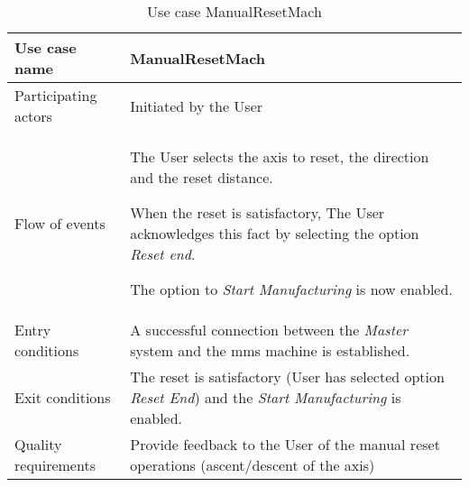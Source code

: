 \begin{table}
  \captionsetup{justification=raggedright, singlelinecheck=false}
  \caption{Use case ManualResetMach}
  \centering
  \begin{tabular}{p{}p{}}
    \hline
    Use case name & \textbf{ManualResetMach} \\ \hline
     Participating actors      & Initiated by the User \\ \hline
     Flow of events & \begin{enum-c}
     \item The User selects the axis to reset, the direction and the reset
       distance.
     \item When the reset is satisfactory, The User acknowledges this fact by
       selecting the option \emph{Reset end}.
     \item The option to \emph{Start Manufacturing} is now enabled.
     \end{enum-c}\\ \hline 
     Entry conditions       &  A successful connection between the \emph{Master}
     system and the \gls{mms} machine is established.\\ \hline 
      Exit conditions & The reset is satisfactory (User has selected option
      \emph{Reset End}) and the \emph{Start Manufacturing} is enabled.      \\ \hline 
      Quality requirements & Provide feedback to the User of the manual reset
      operations (ascent/descent of the axis) \\ \hline 
  \end{tabular}
\label{tab:us-man-reset}
\end{table}

